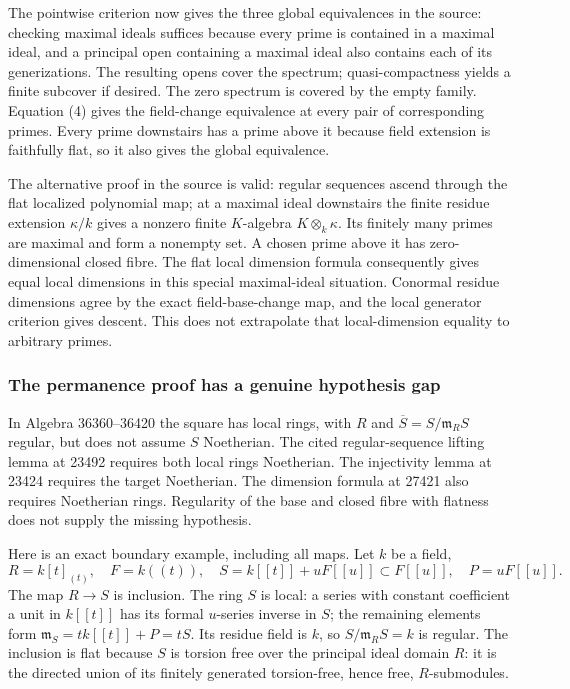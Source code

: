 The pointwise criterion now gives the three global equivalences in the source: checking maximal ideals suffices because every prime is contained in a maximal ideal, and a principal open containing a maximal ideal also contains each of its generizations. The resulting opens cover the spectrum; quasi-compactness yields a finite subcover if desired. The zero spectrum is covered by the empty family. Equation (4) gives the field-change equivalence at every pair of corresponding primes. Every prime downstairs has a prime above it because field extension is faithfully flat, so it also gives the global equivalence.

The alternative proof in the source is valid: regular sequences ascend through the flat localized polynomial map; at a maximal ideal downstairs the finite residue extension \(\kappa/k\) gives a nonzero finite \(K\)-algebra \(K\otimes_k\kappa\). Its finitely many primes are maximal and form a nonempty set. A chosen prime above it has zero-dimensional closed fibre. The flat local dimension formula consequently gives equal local dimensions in this special maximal-ideal situation. Conormal residue dimensions agree by the exact field-base-change map, and the local generator criterion gives descent. This does not extrapolate that local-dimension equality to arbitrary primes.

\subsubsection{The permanence proof has a genuine hypothesis gap}\label{algebra-proof-045-the-permanence-proof-has-a-genuine-hypothesis-gap}

In Algebra 36360--36420 the square has local rings, with \(R\) and \(\overline S=S/\mathfrak m_RS\) regular, but does not assume \(S\) Noetherian. The cited regular-sequence lifting lemma at 23492 requires both local rings Noetherian. The injectivity lemma at 23424 requires the target Noetherian. The dimension formula at 27421 also requires Noetherian rings. Regularity of the base and closed fibre with flatness does not supply the missing hypothesis.

Here is an exact boundary example, including all maps. Let \(k\) be a field, \[
R=k[t]_{(t)},\quad F=k((t)),\quad
S=k[[t]]+uF[[u]]\subset F[[u]],\quad P=uF[[u]].
\] The map \(R\to S\) is inclusion. The ring \(S\) is local: a series with constant coefficient a unit in \(k[[t]]\) has its formal \(u\)-series inverse in \(S\); the remaining elements form \(\mathfrak m_S=tk[[t]]+P=tS\). Its residue field is \(k\), so \(S/\mathfrak m_RS=k\) is regular. The inclusion is flat because \(S\) is torsion free over the principal ideal domain \(R\): it is the directed union of its finitely generated torsion-free, hence free, \(R\)-submodules.

